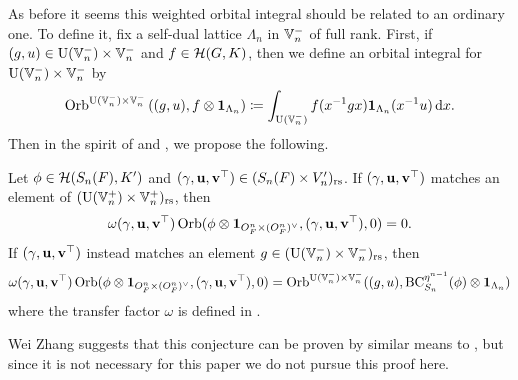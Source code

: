As before it seems this weighted orbital integral should be related to an ordinary one.
To define it, fix a self-dual lattice $\Lambda_n$ in $\mathbb V_n^-$ of full rank.
First, if $(g,u) \in \operatorname{U}(\mathbb V_n^-) \times \mathbb V_n^-$ and $f \in \mathcal H(G,K)$,
then we define an orbital integral for $\operatorname{U}(\mathbb V_n^-) \times \mathbb V_n^-$ by
\begin{equation}
  \Orb^{\U(\VV_n^-) \times \VV_n^-}\left( (g,u), f \otimes \mathbf{1}_{\Lambda_n} \right)
  \coloneqq \int_{\U(\VV_n^-)} f(x\inv g x) \mathbf{1}_{\Lambda_n}(x^{-1} u) \odif x.
  \label{eq:unweighted_orbital_semi_lie}
\end{equation}
Then in the spirit of \cite[Conjecture 1.9]{ref:liuFJ}
and , we propose the following.
\begin{conjecture}
  \label{conj:rel_fundamental_lemma_semilie}
  Let $\phi \in \mathcal H(S_n(F), K')$ and ${(\gamma, \mathbf u, \mathbf v^\top)} \in (S_n(F) \times V_n')_{\mathrm{rs}}$.
  If ${(\gamma, \mathbf u, \mathbf v^\top)}$ matches an element of $(\operatorname{U}(\mathbb V_n^+) \times \mathbb V_n^+)_{\mathrm{rs}}$, then
  \[ \omega{(\gamma, \mathbf u, \mathbf v^\top)} \operatorname{Orb}(\phi \otimes \mathbf{1}_{O_F^n \times (O_F^n)^\vee}, {(\gamma, \mathbf u, \mathbf v^\top)}, 0) = 0. \]
  If ${(\gamma, \mathbf u, \mathbf v^\top)}$ instead matches an element $g \in (\operatorname{U}(\mathbb V_n^-) \times \mathbb V_n^-)_{\mathrm{rs}}$, then
  \[ \omega{(\gamma, \mathbf u, \mathbf v^\top)} \operatorname{Orb}(\phi \otimes \mathbf{1}_{O_F^n \times (O_F^n)^\vee}, {(\gamma, \mathbf u, \mathbf v^\top)}, 0)
    = \operatorname{Orb}^{\operatorname{U}(\mathbb V_n^-) \times \mathbb V_n^-}((g,u), \operatorname{BC}^{\eta^{n-1}}_{S_n}(\phi) \otimes \mathbf{1}_{\Lambda_n}) \]
  where the transfer factor $\omega$ is defined in .
\end{conjecture}
Wei Zhang suggests that this conjecture can be proven by similar means
to ,
but since it is not necessary for this paper we do not pursue this proof here.

